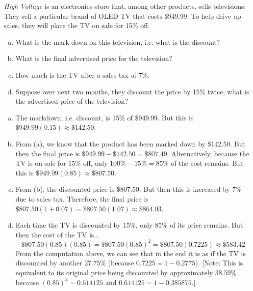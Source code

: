 \documentclass[11pt,letterpaper]{article}
\begin{document}

 \textit{High Voltage} is an electronics store that, among other products, sells televisions. They sell a particular brand of OLED TV that costs \$949.99. To help drive up sales, they will place the TV on sale for 15\% off. 
	\begin{enumerate}[(a)]
	\item What is the mark-down on this television, i.e. what is the discount?
	\item What is the final advertised price for the television?
	\item How much is the TV after a sales tax of 7\%. 
	\item Suppose over next two months, they discount the price by 15\% twice, what is the advertised price of the television? 
	\end{enumerate} \pspace

\sol 
\begin{enumerate}[(a)]
\item The markdown, i.e. discount, is 15\% of \$949.99. But this is $\$949.99(0.15) \approx \$142.50$. \pspace

\item From (a), we know that the product has been marked down by \$142.50. But then the final price is $\$949.99 - \$142.50= \$807.49$. Alternatively, because the TV is on sale for 15\% off, only $100\% - 15\%= 85\%$ of the cost remains. But this is $\$949.99 (0.85) \approx \$807.50$. \pspace

\item From (b), the discounted price is \$807.50. But then this is increased by 7\% due to sales tax. Therefore, the final price is $\$807.50 (1 + 0.07)= \$807.50(1.07) \approx \$864.03$. \pspace

\item Each time the TV is discounted by 15\%, only 85\% of its price remains. But then the cost of the TV is\dots
	\[
	\$807.50 (0.85)(0.85)= \$807.50 (0.85)^2= \$807.50 (0.7225) \approx \$583.42
	\]
From the computation above, we can see that in the end it is as if the TV is discounted by another 27.75\% (because $0.7225= 1 - 0.2775$). [Note: This is equivalent to its original price being discounted by approximately 38.59\% because $(0.85)^3= 0.614125$ and $0.614125= 1 - 0.385875$.]
\end{enumerate}
\end{document}
